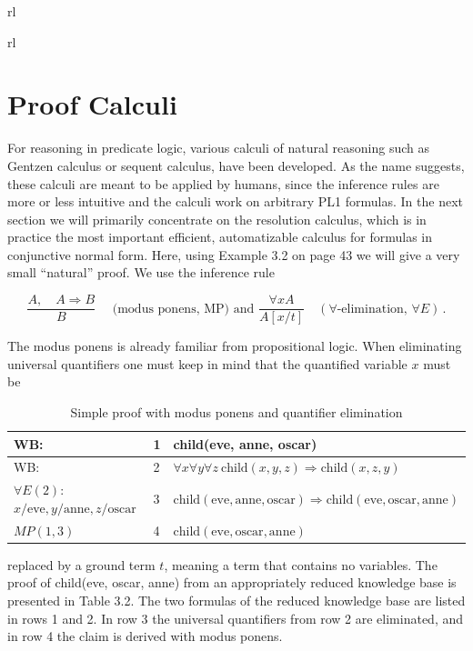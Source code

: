 \documentclass[10pt]{book}
\begin{document}
\begin{center}
\begin{tabular}{rl}
\begin{tabular}{rl}
\section{Proof Calculi}
For reasoning in predicate logic, various calculi of natural reasoning such as Gentzen calculus or sequent calculus, have been developed. As the name suggests, these calculi are meant to be applied by humans, since the inference rules are more or less intuitive and the calculi work on arbitrary PL1 formulas. In the next section we will primarily concentrate on the resolution calculus, which is in practice the most important efficient, automatizable calculus for formulas in conjunctive normal form. Here, using Example 3.2 on page 43 we will give a very small ``natural'' proof. We use the inference rule

$$
\frac{A, \quad A \Rightarrow B}{B} \quad \text{ (modus ponens, MP) and } \frac{\forall x A}{A[x / t]} \quad (\forall\text{-elimination, } \forall E)\,.
$$

The modus ponens is already familiar from propositional logic. When eliminating universal quantifiers one must keep in mind that the quantified variable $x$ must be

\begin{table}[h]
\centering
\caption{Simple proof with modus ponens and quantifier elimination}
\begin{tabular}{lll}
\hline
WB: & 1 & child(eve, anne, oscar) \\
\hline
WB: & 2 & $\forall x \forall y \forall z\ \text{child}(x, y, z) \Rightarrow \text{child}(x, z, y)$ \\
\hline
$\forall E(2):$ $x/\text{eve}, y/\text{anne}, z/\text{oscar}$ & 3 & $\text{child}(\text{eve}, \text{anne}, \text{oscar}) \Rightarrow \text{child}(\text{eve}, \text{oscar}, \text{anne})$ \\
\hline
$MP(1,3)$ & 4 & $\text{child}(\text{eve}, \text{oscar}, \text{anne})$ \\
\hline
\end{tabular}
\end{table}

replaced by a ground term $t$, meaning a term that contains no variables. The proof of child(eve, oscar, anne) from an appropriately reduced knowledge base is presented in Table 3.2.
The two formulas of the reduced knowledge base are listed in rows 1 and 2. In row 3 the universal quantifiers from row 2 are eliminated, and in row 4 the claim is derived with modus ponens.


\end{tabular}
\end{tabular}
\end{center}
\end{document}
